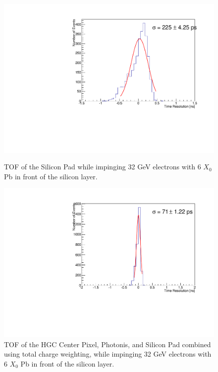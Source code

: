 \documentclass[twocolumn,aps,prd,reprint,superscriptaddress,floatfix]{revtex4-1}
\begin{document}
\begin{figure}[!htb]
	\centering
	\includegraphics[width=\linewidth]{deltaTSiPad.pdf}
	\caption{TOF of the Silicon Pad while impinging 32 GeV electrons with 6 $X_0$ Pb in front of the silicon layer.}
	\label{fig:SiPad}

\centering
	\includegraphics[width=\linewidth]{deltaTWeightsCorrected_totalcharge.pdf}
	\caption{TOF of the HGC Center Pixel, Photonis, and Silicon Pad combined using total charge weighting, while impinging 32 GeV electrons with 6 $X_0$ Pb in front of the silicon layer.}
	\label{fig:wctc}
\end{figure}
\end{document}
